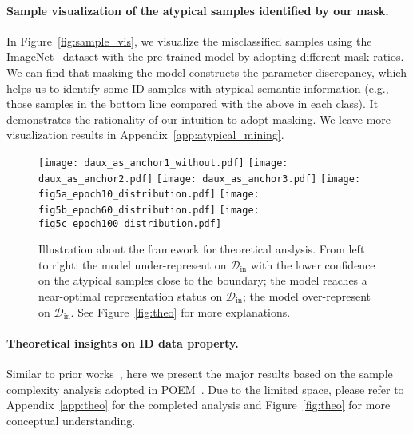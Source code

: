 \documentclass{article}
\theoremstyle{plain}
\theoremstyle{definition}
\theoremstyle{remark}
\begin{document}
\paragraph{Sample visualization of the atypical samples identified by our mask.} 
In Figure~\ref{fig:sample_vis}, we visualize the misclassified samples using the ImageNet~\citep{deng2009imagenet} dataset with the pre-trained model by adopting different mask ratios. We can find that masking the model constructs the parameter discrepancy, which helps us to identify some ID samples with atypical semantic information (e.g., those samples in the bottom line compared with the above in each class). It demonstrates the rationality of our intuition to adopt masking. We leave more visualization results in Appendix~\ref{app:atypical_mining}.


\begin{figure}[t!]
    \begin{center}
    \texttt{[image: daux\_as\_anchor1\_without.pdf]}
    \texttt{[image: daux\_as\_anchor2.pdf]}
    \texttt{[image: daux\_as\_anchor3.pdf]}
    \texttt{[image: fig5a\_epoch10\_distribution.pdf]}
    \texttt{[image: fig5b\_epoch60\_distribution.pdf]}
    \texttt{[image: fig5c\_epoch100\_distribution.pdf]}
    \end{center}
    \vspace{-4mm}
    \caption{Illustration about the framework for theoretical anslysis. From left to right: the model under-represent on $\mathcal{D}_\text{in}$ with the lower confidence on the atypical samples close to the boundary; the model reaches a near-optimal representation status on $\mathcal{D}_\text{in}$; the model over-represent on $\mathcal{D}_\text{in}$. See Figure~\ref{fig:theo} for more explanations.
    }
    \label{fig5:theo_ill}
    \vspace{-3mm}
\end{figure}

\paragraph{Theoretical insights on ID data property.} Similar to prior works~\citep{LeeLLS18, SehwagCM21}, here we present the major results based on the sample complexity analysis adopted in POEM~\citep{ming2022poem}. Due to the limited space,  please refer to Appendix~\ref{app:theo} for the completed analysis and Figure~\ref{fig:theo} for more conceptual understanding.
\end{document}
